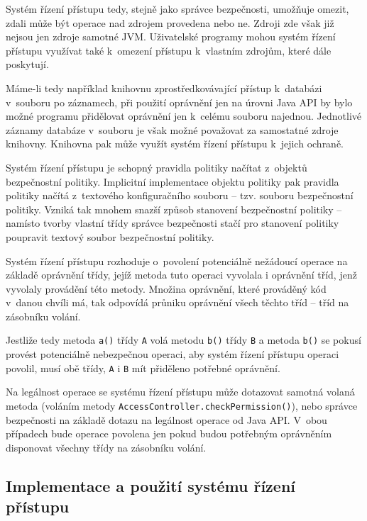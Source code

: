 Systém řízení přístupu tedy, stejně jako správce bezpečnosti, umožňuje omezit, zdali může být operace nad zdrojem provedena nebo ne. Zdroji zde však již nejsou jen zdroje samotné JVM. Uživatelské programy mohou systém řízení přístupu využívat také k~omezení přístupu k~vlastním zdrojům, které dále poskytují.~\cite{oaks}

Máme-li tedy například knihovnu zprostředkovávající přístup k~databázi v~souboru po záznamech, při použití oprávnění jen na úrovni Java API by bylo možné programu přidělovat oprávnění jen k~celému souboru najednou. Jednotlivé záznamy databáze v~souboru je však možné považovat za samostatné zdroje knihovny. Knihovna pak může využít systém řízení přístupu k~jejich ochraně.

Systém řízení přístupu je schopný pravidla politiky načítat z~objektů bezpečnostní politiky.
Implicitní implementace objektu politiky pak pravidla politiky načítá z~textového konfiguračního souboru -- tzv. souboru bezpečnostní politiky.
Vzniká tak mnohem snazší způsob stanovení bezpečnostní politiky -- namísto tvorby vlastní třídy správce bezpečnosti stačí pro stanovení politiky poupravit textový soubor bezpečnostní politiky.~\cite{oaks}

Systém řízení přístupu rozhoduje o~povolení potenciálně nežádoucí operace na základě oprávnění třídy, jejíž metoda tuto operaci vyvolala i oprávnění tříd,
jenž vyvolaly provádění této metody.
Množina oprávnění, které prováděný kód v~danou chvíli má, tak odpovídá průniku oprávnění všech těchto tříd -- tříd na zásobníku volání.

Jestliže tedy metoda {\tt a()} třídy {\tt A} volá metodu {\tt b()} třídy {\tt B} a metoda {\tt b()} se pokusí provést potenciálně nebezpečnou operaci,
aby systém řízení přístupu operaci povolil, musí obě třídy, {\tt A} i {\tt B} mít přiděleno potřebné oprávnění.

Na legálnost operace se systému řízení přístupu může dotazovat samotná volaná metoda (voláním metody {\tt AccessController.checkPermission()}), nebo správce bezpečnosti na základě dotazu na legálnost operace od Java API. V~obou případech bude operace povolena jen pokud budou potřebným oprávněním disponovat všechny třídy na zásobníku volání.

\subsection{Implementace a použití systému řízení přístupu}\label{implementaceAC}

